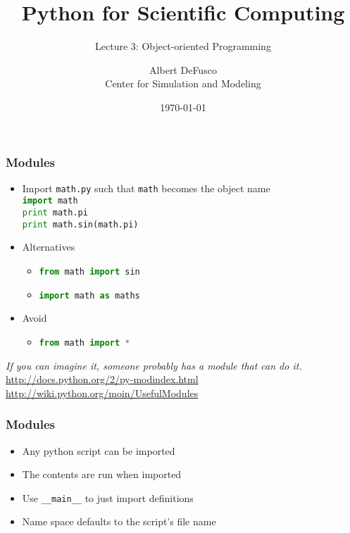 \documentclass[xcolor=table,10pt,final]{beamer}
\begin{document}
\title{Python for Scientific Computing}
\subtitle{Lecture 3: Object-oriented Programming}
\author{Albert DeFusco\\Center for Simulation and Modeling}
\date{\today}


\frame{\titlepage}

\begin{frame}
  \frametitle{Modules}
  \begin{itemize}
    \item Import {\tt math.py} such that {\tt math} becomes the object name\\
      \lstinline[language=Python]|import math|\\
      \lstinline[language=Python]|print math.pi|\\
      \lstinline[language=Python]|print math.sin(math.pi)|
    \item Alternatives
      \begin{itemize}
        \item \lstinline[language=Python]|from math import sin|
        \item \lstinline[language=Python]|import math as maths|
      \end{itemize}
    \item Avoid
      \begin{itemize}
        \item \lstinline[language=Python]|from math import *|
      \end{itemize}
  \end{itemize}
  \vskip1cm
{\it If you can imagine it, someone probably has a module that can do it.}\\
{\scriptsize \url{http://docs.python.org/2/py-modindex.html}}\\
{\scriptsize \url{http://wiki.python.org/moin/UsefulModules}}\\
\end{frame}

\begin{frame}
  \frametitle{Modules}
  \begin{itemize}
    \item Any python script can be imported
    \item The contents are run when imported
    \item Use \lstinline[language=Python]|__main__| to just import definitions
    \item Name space defaults to the script's file name
  \end{itemize}
\end{frame}
\end{document}
